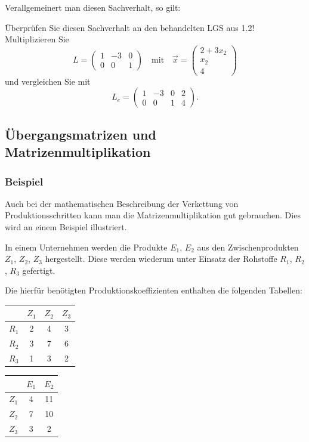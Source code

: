 Verallgemeinert man diesen Sachverhalt, so gilt:

Überprüfen Sie diesen Sachverhalt an den behandelten LGS aus 1.2! Multiplizieren Sie
\[ L = \begin{pmatrix} 1 & -3 & 0 \\ 0 & 0 & 1 \end{pmatrix} \quad \text{mit} \quad \vec{x} = \begin{pmatrix} 2 + 3x_2 \\ x_2 \\ 4 \end{pmatrix} \]
und vergleichen Sie mit
\[ L_e = \left(\begin{array}{ccc|c} 1 & -3 & 0 & 2 \\ 0 & 0 & 1 & 4 \end{array}\right) . \]

\subsection{Übergangsmatrizen und Matrizenmultiplikation}

\subsubsection{Beispiel}

Auch bei der mathematischen Beschreibung der Verkettung von Produktionsschritten kann man die Matrizenmultiplikation gut gebrauchen. Dies wird an einem Beispiel illustriert.

In einem Unternehmen werden die Produkte $E_1$, $E_2$ aus den Zwischenprodukten $Z_1$, $Z_2$, $Z_3$ hergestellt. Diese werden wiederum unter Einsatz der Rohstoffe $R_1$, $R_2$, $R_3$ gefertigt.

Die hierfür benötigten Produktionskoeffizienten enthalten die folgenden Tabellen:

\begin{center}
  \begin{tabular}{l|ccc}
     & $Z_1$ & $Z_2$ & $Z_3$\\
    \hline
    $R_1$ & 2 & 4 & 3\\
    $R_2$ & 3 & 7 & 6\\
    $R_3$ & 1 & 3 & 2
  \end{tabular}
  \qquad\qquad
  \begin{tabular}{l|cc}
     & $E_1$ & $E_2$\\
    \hline
    $Z_1$ & 4 & 11\\
    $Z_2$ & 7 & 10\\
    $Z_3$ & 3 & 2
  \end{tabular}
\end{center}

